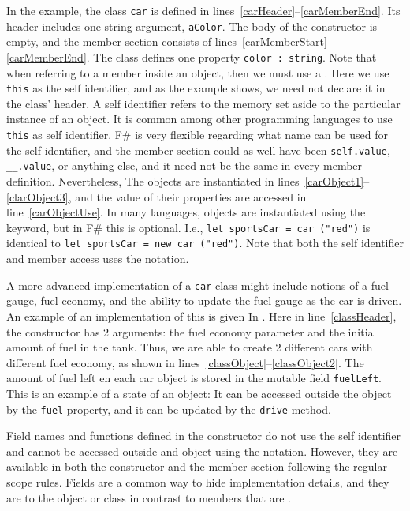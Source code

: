 \documentclass[fsharpNotes.tex]{subfiles}
\begin{document}
In the example, the class \lstinline{car} is defined in lines~\ref{carHeader}--\ref{carMemberEnd}. Its header includes one string argument, \lstinline{aColor}. The body of the constructor is empty, and the member section consists of lines~\ref{carMemberStart}--\ref{carMemberEnd}. The class defines one property \lstinline{color : string}. Note that when referring to a member inside an object, then we must use a . Here we use \lstinline{this} as the self identifier, and as the example shows, we need not declare it in the class' header. A self identifier refers to the memory set aside to the particular instance of an object. It is common among other programming languages to use \lstinline{this} as self identifier. F\# is very flexible regarding what name can be used for the self-identifier, and the member section could as well have been \lstinline{self.value}, \lstinline{__.value}, or anything else, and it need not be the same in every member definition. Nevertheless,  The objects are instantiated in lines~\ref{carObject1}--\ref{clarObject3}, and the value of their properties are accessed in line~\ref{carObjectUse}. In many languages, objects are instantiated using the  keyword, but in F\# this is optional. I.e., \lstinline{let sportsCar = car ("red")} is identical to \lstinline{let sportsCar = new car ("red")}. Note that both the self identifier and member access uses the  notation.

A more advanced implementation of a \lstinline{car} class might include notions of a fuel gauge, fuel economy, and the ability to update the fuel gauge as the car is driven. An example of an implementation of this is given In .
%
%
%
Here in line~\ref{classHeader}, the constructor has 2 arguments: the fuel economy parameter and the initial amount of fuel in the tank. Thus, we are able to create 2 different cars with different fuel economy, as shown in lines~\ref{classObject}--\ref{classObject2}. The amount of fuel left en each car object is stored in the mutable field \lstinline{fuelLeft}. This is an example of a state of an object: It can be accessed outside the object by the \lstinline{fuel} property, and it can be updated by the \lstinline{drive} method. 

Field names and functions defined in the constructor do not use the self identifier and cannot be accessed outside and object using the  notation. However, they are available in both the constructor and the member section following the regular scope rules. Fields are a common way to hide implementation details, and they are  to the object or class in contrast to members that are .
\end{document}
